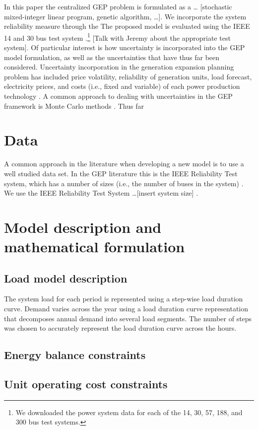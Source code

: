 \documentclass[10pt]{amsart}
\begin{document}
In this paper the centralized GEP problem is formulated as a \ldots
[stochastic mixed-integer linear program, genetic algorithm, \ldots]. 
We incorporate the system reliability measure through the 
The proposed model is evaluated using the IEEE 14 and 30 bus test system \parencite{christie:2009aa}.\footnote{We downloaded the power system data for each of the 14, 30, 57, 188, and 300 bus test systems.}  
[Talk with Jeremy about the appropriate test system].
Of particular interest is how uncertainty is incorporated into the GEP model formulation, as well as the uncertainties that have thus far been considered. 
Uncertainty incorporation in the generation expansion planning problem has included price volatility, reliability of generation units, load forecast, electricity prices, and costs (i.e., fixed and variable) of each power production technology \cite{hemmati:2013ab, pereira2010decision, pereira2011generation}. 
A common approach to dealing with uncertainties in the GEP framework is Monte Carlo methods \parencite{pereira2010decision}.
Thus far 

\section{Data}
A common approach in the literature when developing a new model is to use a well studied data set. 
In the GEP literature this is the IEEE Reliability Test system, which has a number of sizes (i.e., the number of buses in the system) \parencite{billinton:1994aa}. 
We use the IEEE Reliability Test System \ldots [insert system size] \parencite{}. 

\section{Model description and mathematical formulation}
\subsection{Load model description}
The system load for each period is represented using a step-wise load duration curve. 
Demand varies across the year using a load duration curve representation that decomposes annual demand into several load segments. 
The number of steps was chosen to accurately represent the load duration curve across the hours.
\subsection{Energy balance constraints}
\subsection{Unit operating cost constraints}
\end{document}
